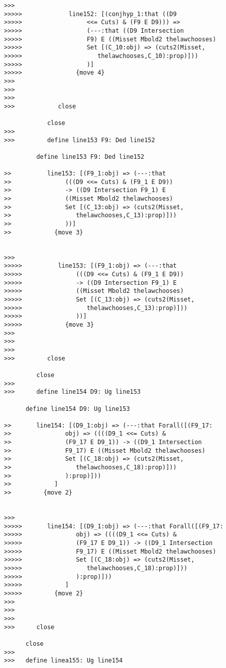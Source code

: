 \documentclass[12pt]{article}
\begin{document}
\begin{verbatim}
>>>
>>>>>             line152: [(conjhyp_1:that ((D9
>>>>>                  <<= Cuts) & (F9 E D9))) =>
>>>>>                  (---:that ((D9 Intersection
>>>>>                  F9) E ((Misset Mbold2 thelawchooses)
>>>>>                  Set [(C_10:obj) => (cuts2(Misset,
>>>>>                     thelawchooses,C_10):prop)]))
>>>>>                  )]
>>>>>               {move 4}
>>>
>>>
>>>
>>>            close

            close
>>>
>>>         define line153 F9: Ded line152

         define line153 F9: Ded line152

>>          line153: [(F9_1:obj) => (---:that
>>               (((D9 <<= Cuts) & (F9_1 E D9))
>>               -> ((D9 Intersection F9_1) E
>>               ((Misset Mbold2 thelawchooses)
>>               Set [(C_13:obj) => (cuts2(Misset,
>>                  thelawchooses,C_13):prop)]))
>>               ))]
>>            {move 3}


>>>
>>>>>          line153: [(F9_1:obj) => (---:that
>>>>>               (((D9 <<= Cuts) & (F9_1 E D9))
>>>>>               -> ((D9 Intersection F9_1) E
>>>>>               ((Misset Mbold2 thelawchooses)
>>>>>               Set [(C_13:obj) => (cuts2(Misset,
>>>>>                  thelawchooses,C_13):prop)]))
>>>>>               ))]
>>>>>            {move 3}
>>>
>>>
>>>
>>>         close

         close
>>>
>>>      define line154 D9: Ug line153

      define line154 D9: Ug line153

>>       line154: [(D9_1:obj) => (---:that Forall([(F9_17:
>>               obj) => ((((D9_1 <<= Cuts) &
>>               (F9_17 E D9_1)) -> ((D9_1 Intersection
>>               F9_17) E ((Misset Mbold2 thelawchooses)
>>               Set [(C_18:obj) => (cuts2(Misset,
>>                  thelawchooses,C_18):prop)]))
>>               ):prop)]))
>>            ]
>>         {move 2}


>>>
>>>>>       line154: [(D9_1:obj) => (---:that Forall([(F9_17:
>>>>>               obj) => ((((D9_1 <<= Cuts) &
>>>>>               (F9_17 E D9_1)) -> ((D9_1 Intersection
>>>>>               F9_17) E ((Misset Mbold2 thelawchooses)
>>>>>               Set [(C_18:obj) => (cuts2(Misset,
>>>>>                  thelawchooses,C_18):prop)]))
>>>>>               ):prop)]))
>>>>>            ]
>>>>>         {move 2}
>>>
>>>
>>>
>>>      close

      close
>>>
>>>   define linea155: Ug line154


\end{verbatim}
\end{document}
